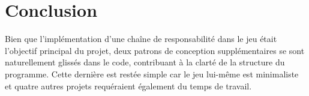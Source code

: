 \documentclass[11pt,a4paper,twoside,svgnames]{article}
\begin{document}
\section{Conclusion}
Bien que l'implémentation d'une chaîne de responsabilité dans le jeu était l'objectif principal du projet, deux patrons de conception supplémentaires se sont naturellement glissés dans le code, contribuant à la clarté de la structure du programme. Cette dernière est restée simple car le jeu lui-même est minimaliste et quatre autres projets requéraient également du temps de travail.
\end{document}
